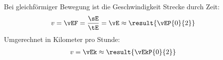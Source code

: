 Bei gleichförmiger Bewegung ist die Geschwindigkeit Strecke durch Zeit:
\begin{align}
 v &= \vEF = \frac{\sE}{\tE} = \vE \approx \result{\vEP{0}{2}}
\end{align}
Umgerechnet in Kilometer pro Stunde:
\begin{align}
 v &= \vEk \approx \result{\vEkP{0}{2}}
\end{align}
